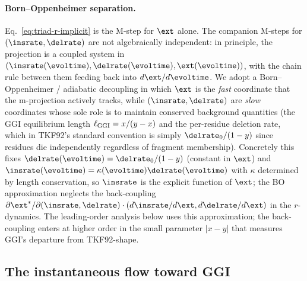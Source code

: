 \paragraph{Born--Oppenheimer separation.}
Eq.~\eqref{eq:triad-r-implicit} is the M-step for $\ext$ alone.  The companion
M-steps for $(\insrate,\delrate)$ are not algebraically independent: in
principle, the projection is a coupled system in $(\insrate(\evoltime),
\delrate(\evoltime),\ext(\evoltime))$, with the chain rule between them
feeding back into $d\ext/d\evoltime$.  We adopt a Born--Oppenheimer / adiabatic
decoupling in which $\ext$ is the \emph{fast} coordinate that the m-projection
actively tracks, while $(\insrate,\delrate)$ are \emph{slow} coordinates whose
sole role is to maintain conserved background quantities (the GGI equilibrium
length $\ell_{\mathrm{GGI}}=x/(y-x)$ and the per-residue deletion rate, which in
TKF92's standard convention is simply $\delrate_0/(1-y)$ since residues die
independently regardless of fragment membership).  Concretely this fixes
$\delrate(\evoltime)=\delrate_0/(1-y)$ (constant in $\ext$) and
$\insrate(\evoltime)=\kappa(\evoltime)\delrate(\evoltime)$ with
$\kappa$ determined by length conservation, so $\insrate$ is the explicit
function of $\ext$; the BO approximation neglects the back-coupling
$\partial\ext^\ast/\partial(\insrate,\delrate)\cdot(d\insrate/d\ext,d\delrate/d\ext)$
in the $r$-dynamics.  The leading-order analysis below uses this
approximation; the back-coupling enters at higher order in the small
parameter $|x-y|$ that measures GGI's departure from TKF92-shape.

\subsection{The instantaneous flow toward GGI}
\label{sec:comp-ggi-flow}

